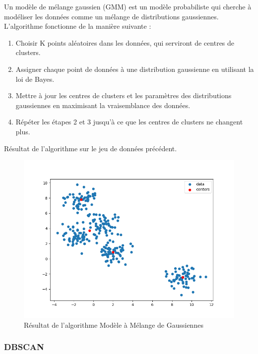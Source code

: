 \documentclass[french,a4paper,18pt]{article}
\begin{document}
Un modèle de mélange gaussien (GMM) est un modèle probabiliste qui cherche à modéliser les données comme un mélange de distributions gaussiennes.
L'algorithme fonctionne de la manière suivante :
\begin{enumerate}
    \item Choisir K points aléatoires dans les données, qui serviront de centres de clusters.
    \item Assigner chaque point de données à une distribution gaussienne en utilisant la loi de Bayes.
    \item Mettre à jour les centres de clusters et les paramètres des distributions gaussiennes en maximisant la vraisemblance des données.
    \item Répéter les étapes 2 et 3 jusqu'à ce que les centres de clusters ne changent plus.
\end{enumerate}

Résultat de l'algorithme sur le jeu de données précédent.
\begin{figure}[h!]
    \centering
    \includegraphics[scale=0.3]{../images/short_simulation_gmm.png}
    \caption{Résultat de l'algorithme Modèle à Mélange de Gaussiennes}\label{fig:short_simulation_gmm}
\end{figure}

\subsubsection{DBSCAN}
\end{document}
